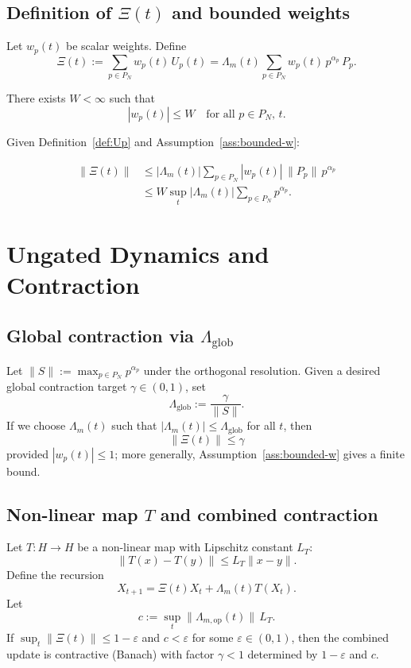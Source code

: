 \documentclass[11pt]{article}
\begin{document}
\subsection{Definition of $\Xi(t)$ and bounded weights}

\begin{definition}\label{def:Xi}
Let $w_p(t)$ be scalar weights. Define
\[
\Xi(t) := \sum_{p \in P_N} w_p(t)\, U_p(t)
= \Lambda_m(t) \sum_{p \in P_N} w_p(t)\, p^{\alpha_p}\, P_p.
\]
\end{definition}

\begin{assumption}\label{ass:bounded-w}
There exists $W < \infty$ such that
\[
|w_p(t)| \le W \quad \text{for all } p \in P_N,\, t.
\]
\end{assumption}

Given Definition~\ref{def:Up} and Assumption~\ref{ass:bounded-w}:

\begin{align*}
\|\Xi(t)\|
&\le |\Lambda_m(t)| \sum_{p \in P_N} |w_p(t)|\, \|P_p\|\, p^{\alpha_p} \\
&\le W \sup_t |\Lambda_m(t)| \sum_{p \in P_N} p^{\alpha_p}.
\end{align*}

\section{Ungated Dynamics and Contraction}

\subsection{Global contraction via $\Lambda_{\mathrm{glob}}$}

Let $\|S\| := \max_{p \in P_N} p^{\alpha_p}$ under the orthogonal resolution.
Given a desired global contraction target $\gamma \in (0,1)$, set
\[
\Lambda_{\mathrm{glob}} := \frac{\gamma}{\|S\|}.
\]
If we choose $\Lambda_m(t)$ such that $|\Lambda_m(t)| \le \Lambda_{\mathrm{glob}}$
for all $t$, then
\[
\|\Xi(t)\| \le \gamma
\]
provided $|w_p(t)| \le 1$; more generally, Assumption~\ref{ass:bounded-w}
gives a finite bound.

\subsection{Non-linear map $T$ and combined contraction}

Let $T: H \to H$ be a non-linear map with Lipschitz constant $L_T$:
\[
\|T(x) - T(y)\| \le L_T \|x-y\|.
\]
Define the recursion
\begin{equation}\label{eq:core-recursion}
X_{t+1} = \Xi(t) X_t + \Lambda_m(t) T(X_t).
\end{equation}
Let
\[
c := \sup_t \|\Lambda_{m,\mathrm{op}}(t)\|\, L_T.
\]
If $\sup_t \|\Xi(t)\| \le 1 - \varepsilon$ and $c < \varepsilon$ for some
$\varepsilon \in (0,1)$, then the combined update is contractive (Banach) with
factor $\gamma < 1$ determined by $1-\varepsilon$ and $c$.\cite{postquantum-intro}
\end{document}
